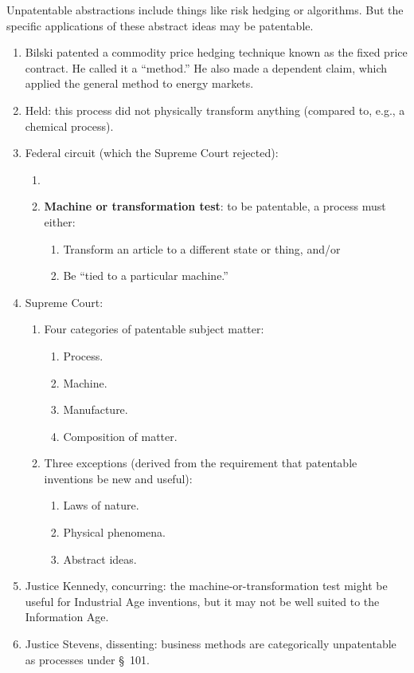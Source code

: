 Unpatentable abstractions include things like risk hedging or algorithms. But 
the specific applications of these abstract ideas may be patentable.

\begin{enumerate}
    \item Bilski patented a commodity price hedging technique known as the fixed 
    price contract. He called it a ``method.'' He also made a dependent claim, 
    which applied the general method to energy markets.
    \item Held: this process did not physically transform anything (compared to, 
    e.g., a chemical process).
    \item Federal circuit (which the Supreme Court rejected):
    \begin{enumerate}
        \item 
        \item \textbf{Machine or transformation test}: to be patentable, a 
        process must either:
        \begin{enumerate}
            \item Transform an article to a different state or thing, and/or
            \item Be ``tied to a particular machine.''
        \end{enumerate}
    \end{enumerate}
    \item Supreme Court:
    \begin{enumerate}
        \item Four categories of patentable subject matter:
        \begin{enumerate}
            \item Process.
            \item Machine. 
            \item Manufacture.
            \item Composition of matter.
        \end{enumerate}
        \item Three exceptions (derived from the requirement that patentable 
        inventions be new and useful):
        \begin{enumerate}
            \item Laws of nature.
            \item Physical phenomena.
            \item Abstract ideas.
        \end{enumerate}
    \end{enumerate}
    \item Justice Kennedy, concurring: the machine-or-transformation test might 
    be useful for Industrial Age inventions, but it may not be well suited to 
    the Information Age.
    \item Justice Stevens, dissenting: business methods are categorically 
    unpatentable as processes under \S\ 101.
\end{enumerate}

